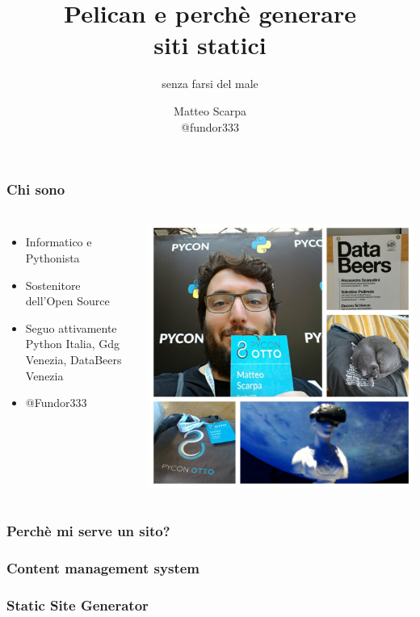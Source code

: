 
\title{Pelican e perchè generare\\ siti statici}
\subtitle{senza farsi del male}
\author{Matteo Scarpa \\ @fundor333}


	\frame{\maketitle}
	
	\begin{frame}
	\frametitle{Chi sono}
		\begin{columns}
			\begin{itemize}
				\item Informatico e Pythonista
				\item Sostenitore dell'Open Source
				\item Seguo attivamente Python Italia, Gdg Venezia, DataBeers Venezia
				\item @Fundor333
			\end{itemize}
			\includegraphics[scale=0.08]{img/foto}
		\end{columns}	
	\end{frame}


	\begin{frame}
		\frametitle{Perchè mi serve un sito?}
	\end{frame}

	\begin{frame}
		\frametitle{Content management system}
	\end{frame}
	
	\begin{frame}
		\frametitle{Static Site Generator}
	\end{frame}


